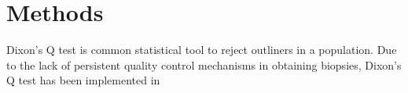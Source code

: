 \chapter{Methods}

Dixon's Q test is common statistical tool to reject outliners in a population. Due to the lack of persistent quality control mechanisms in obtaining biopsies, Dixon's Q test has been implemented in 